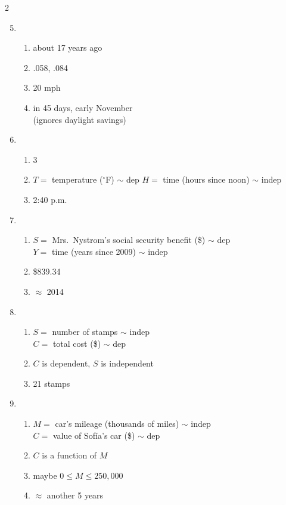 \begin{multicols} {2}
\begin{enumerate}
\setcounter{enumi}{4}

\item %
\begin{enumerate}
\item about 17 years ago %
\item .058, .084 %
\item 20 mph %
\item in 45 days, early November \\ (ignores daylight savings) %
\end{enumerate}

\item %
\begin{enumerate}
\item 3
\item $T = $ temperature ($^\circ$F) $\sim$ dep $H = $ time (hours since noon) $\sim$ indep
\item 2:40 p.m.
\end{enumerate}

\item %
\begin{enumerate}
\item $S =$ Mrs.\ Nystrom's social security benefit (\$) $\sim$ dep \\ $Y=$ time (years since 2009) $\sim$ indep
\item \$839.34
\item $\approx$ 2014
\end{enumerate}


\item %
\begin{enumerate}
\item $S=$ number of stamps $\sim$ indep \\ $C=$ total cost (\$) $\sim$ dep
\item $C$ is dependent, $S$ is independent
\item 21 stamps 
\end{enumerate}

\item %
\begin{enumerate}
\item $M=$ car's mileage (thousands of miles) $\sim$ indep \\ $C=$ value of Sof\'ia's car (\$) $\sim$ dep
\item $C$ is a function of $M$
\item maybe $0 \le M \le 250,000$
\item $\approx$ another 5 years
\end{enumerate}


\end{enumerate}
\end{multicols}
